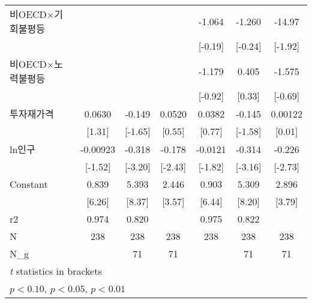 \begin{tabular}{l*{6}{c}}
\addlinespace
비OECD$\times$기회불평등&                     &                     &                     &      -1.064         &      -1.260         &      -14.97\sym{*}  \\
                    &                     &                     &                     &     [-0.19]         &     [-0.24]         &     [-1.92]         \\
\addlinespace
비OECD$\times$노력불평등&                     &                     &                     &      -1.179         &       0.405         &      -1.575         \\
                    &                     &                     &                     &     [-0.92]         &      [0.33]         &     [-0.69]         \\
\addlinespace
투자재가격        &      0.0630         &      -0.149         &      0.0520         &      0.0382         &      -0.145         &     0.00122         \\
                    &      [1.31]         &     [-1.65]         &      [0.55]         &      [0.77]         &     [-1.58]         &      [0.01]         \\
\addlinespace
ln인구            &    -0.00923         &      -0.318\sym{***}&      -0.178\sym{**} &     -0.0121\sym{*}  &      -0.314\sym{***}&      -0.226\sym{***}\\
                    &     [-1.52]         &     [-3.20]         &     [-2.43]         &     [-1.82]         &     [-3.16]         &     [-2.73]         \\
\addlinespace
Constant            &       0.839\sym{***}&       5.393\sym{***}&       2.446\sym{***}&       0.903\sym{***}&       5.309\sym{***}&       2.896\sym{***}\\
                    &      [6.26]         &      [8.37]         &      [3.57]         &      [6.44]         &      [8.20]         &      [3.79]         \\
\midrule
r2                  &       0.974         &       0.820         &                     &       0.975         &       0.822         &                     \\
N                   &         238         &         238         &         238         &         238         &         238         &         238         \\
N\_g                 &                     &          71         &          71         &                     &          71         &          71         \\
\bottomrule
\multicolumn{7}{l}{\footnotesize \textit{t} statistics in brackets}\\
\multicolumn{7}{l}{\footnotesize \sym{*} \(p<0.10\), \sym{**} \(p<0.05\), \sym{***} \(p<0.01\)}\\
\end{tabular}